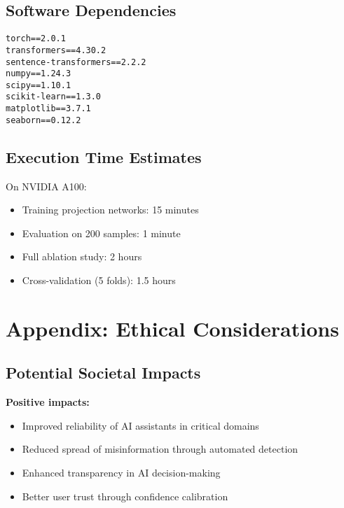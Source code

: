 \documentclass[11pt]{article}
\begin{document}
\subsection{Software Dependencies}

\begin{verbatim}
torch==2.0.1
transformers==4.30.2
sentence-transformers==2.2.2
numpy==1.24.3
scipy==1.10.1
scikit-learn==1.3.0
matplotlib==3.7.1
seaborn==0.12.2
\end{verbatim}

\subsection{Execution Time Estimates}

On NVIDIA A100:
\begin{itemize}[leftmargin=*]
    \item Training projection networks: 15 minutes
    \item Evaluation on 200 samples: 1 minute
    \item Full ablation study: 2 hours
    \item Cross-validation (5 folds): 1.5 hours
\end{itemize}

\section{Appendix: Ethical Considerations}
\label{app:ethics}

\subsection{Potential Societal Impacts}

\textbf{Positive impacts:}
\begin{itemize}[leftmargin=*]
    \item Improved reliability of AI assistants in critical domains
    \item Reduced spread of misinformation through automated detection
    \item Enhanced transparency in AI decision-making
    \item Better user trust through confidence calibration
\end{itemize}
\end{document}
